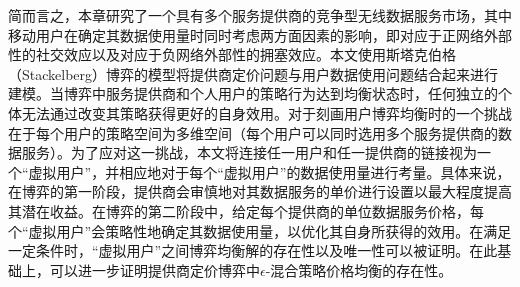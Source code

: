 简而言之，本章研究了一个具有多个服务提供商的竞争型无线数据服务市场，其中移动用户在确定其数据使用量时同时考虑两方面因素的影响，即对应于正网络外部性的社交效应以及对应于负网络外部性的拥塞效应。本文使用斯塔克伯格（Stackelberg）博弈\cite{osborne}的模型将提供商定价问题与用户数据使用问题结合起来进行建模。当博弈中服务提供商和个人用户的策略行为达到均衡状态时，任何独立的个体无法通过改变其策略获得更好的自身效用。对于刻画用户博弈均衡时的一个挑战在于每个用户的策略空间为多维空间（每个用户可以同时选用多个服务提供商的数据服务）。为了应对这一挑战，本文将连接任一用户和任一提供商的链接视为一个“虚拟用户”，并相应地对于每个“虚拟用户”的数据使用量进行考量。具体来说，在博弈的第一阶段，提供商会审慎地对其数据服务的单价进行设置以最大程度提高其潜在收益。在博弈的第二阶段中，给定每个提供商的单位数据服务价格，每个“虚拟用户”会策略性地确定其数据使用量，以优化其自身所获得的效用。在满足一定条件时，“虚拟用户”之间博弈均衡解的存在性以及唯一性可以被证明。在此基础上，可以进一步证明提供商定价博弈中$\epsilon$-混合策略价格均衡的存在性。

